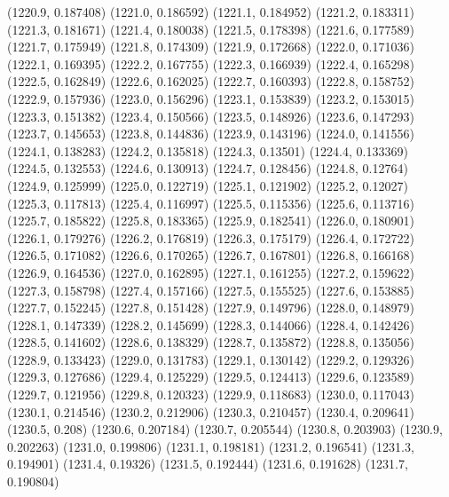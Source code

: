 {					(1220.9, 0.187408)
					(1221.0, 0.186592)
					(1221.1, 0.184952)
					(1221.2, 0.183311)
					(1221.3, 0.181671)
					(1221.4, 0.180038)
					(1221.5, 0.178398)
					(1221.6, 0.177589)
					(1221.7, 0.175949)
					(1221.8, 0.174309)
					(1221.9, 0.172668)
					(1222.0, 0.171036)
					(1222.1, 0.169395)
					(1222.2, 0.167755)
					(1222.3, 0.166939)
					(1222.4, 0.165298)
					(1222.5, 0.162849)
					(1222.6, 0.162025)
					(1222.7, 0.160393)
					(1222.8, 0.158752)
					(1222.9, 0.157936)
					(1223.0, 0.156296)
					(1223.1, 0.153839)
					(1223.2, 0.153015)
					(1223.3, 0.151382)
					(1223.4, 0.150566)
					(1223.5, 0.148926)
					(1223.6, 0.147293)
					(1223.7, 0.145653)
					(1223.8, 0.144836)
					(1223.9, 0.143196)
					(1224.0, 0.141556)
					(1224.1, 0.138283)
					(1224.2, 0.135818)
					(1224.3, 0.13501)
					(1224.4, 0.133369)
					(1224.5, 0.132553)
					(1224.6, 0.130913)
					(1224.7, 0.128456)
					(1224.8, 0.12764)
					(1224.9, 0.125999)
					(1225.0, 0.122719)
					(1225.1, 0.121902)
					(1225.2, 0.12027)
					(1225.3, 0.117813)
					(1225.4, 0.116997)
					(1225.5, 0.115356)
					(1225.6, 0.113716)
					(1225.7, 0.185822)
					(1225.8, 0.183365)
					(1225.9, 0.182541)
					(1226.0, 0.180901)
					(1226.1, 0.179276)
					(1226.2, 0.176819)
					(1226.3, 0.175179)
					(1226.4, 0.172722)
					(1226.5, 0.171082)
					(1226.6, 0.170265)
					(1226.7, 0.167801)
					(1226.8, 0.166168)
					(1226.9, 0.164536)
					(1227.0, 0.162895)
					(1227.1, 0.161255)
					(1227.2, 0.159622)
					(1227.3, 0.158798)
					(1227.4, 0.157166)
					(1227.5, 0.155525)
					(1227.6, 0.153885)
					(1227.7, 0.152245)
					(1227.8, 0.151428)
					(1227.9, 0.149796)
					(1228.0, 0.148979)
					(1228.1, 0.147339)
					(1228.2, 0.145699)
					(1228.3, 0.144066)
					(1228.4, 0.142426)
					(1228.5, 0.141602)
					(1228.6, 0.138329)
					(1228.7, 0.135872)
					(1228.8, 0.135056)
					(1228.9, 0.133423)
					(1229.0, 0.131783)
					(1229.1, 0.130142)
					(1229.2, 0.129326)
					(1229.3, 0.127686)
					(1229.4, 0.125229)
					(1229.5, 0.124413)
					(1229.6, 0.123589)
					(1229.7, 0.121956)
					(1229.8, 0.120323)
					(1229.9, 0.118683)
					(1230.0, 0.117043)
					(1230.1, 0.214546)
					(1230.2, 0.212906)
					(1230.3, 0.210457)
					(1230.4, 0.209641)
					(1230.5, 0.208)
					(1230.6, 0.207184)
					(1230.7, 0.205544)
					(1230.8, 0.203903)
					(1230.9, 0.202263)
					(1231.0, 0.199806)
					(1231.1, 0.198181)
					(1231.2, 0.196541)
					(1231.3, 0.194901)
					(1231.4, 0.19326)
					(1231.5, 0.192444)
					(1231.6, 0.191628)
					(1231.7, 0.190804)
}
